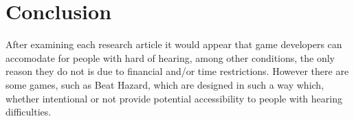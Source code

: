\documentclass{scrartcl}
\begin{document}
\section{Conclusion}
After examining each research article it would appear that game developers can accomodate for people with hard of hearing, among other conditions, the only reason they do not is due to
financial and/or time restrictions. However there are some games, such as Beat Hazard, which are designed in such a way which, whether intentional or not provide potential accessibility to people with hearing difficulties. 


\end{document}
